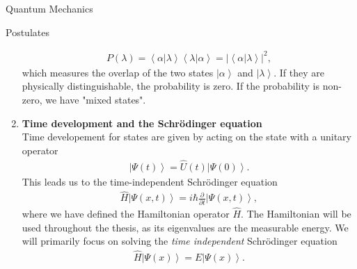 \documentclass[twoside,english]{uiofysmaster}
\begin{document}
\begin{chapter}{Quantum Mechanics}
\begin{section}{Postulates}
\begin{enumerate}
 			\begin{align}
 				P(\lambda) = \left< \alpha | \lambda \right> \left< \lambda | \alpha \right> = | \left< \alpha | \lambda \right> |^2,
 			\end{align}
 			which measures the overlap of the two states $\left| \alpha \right>$ and $\left| \lambda \right>$. If they are physically distinguishable, the probability is zero. If the probability is non-zero, we have "mixed states".
 			\item \textbf{Time development and the Schr\"{o}dinger equation}\\
 			Time developement for states are given by acting on the state with a unitary operator
 			\begin{align}
 				\left| \Psi(t) \right> = \hat U(t) \left| \Psi(0) \right>.
 			\end{align}
 			This leads us to the time-independent Schr\"{o}dinger equation
 			\begin{align}
 				\hat H \left| \Psi(x,t) \right> = i \hbar \frac{\partial}{\partial t} \left| \Psi(x,t) \right>, 
 			\end{align}
 			where we have defined the Hamiltonian operator $\hat H$. The Hamiltonian will be used throughout the thesis, as its eigenvalues are the measurable energy. We will primarily focus on solving the \textit{time independent} Schr\"{o}dinger equation
 			\begin{align}
 				\hat H \left| \Psi(x) \right> = E \left| \Psi(x) \right>.
 			\end{align} 
 		\end{enumerate}
 	\end{section}


\end{chapter}
\end{document}
